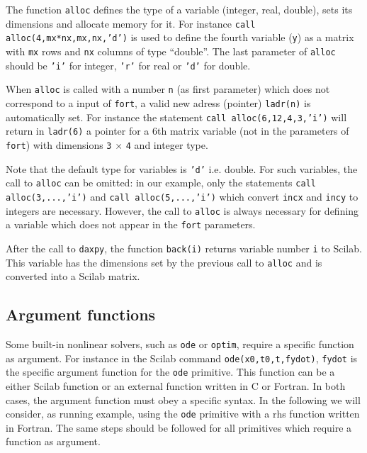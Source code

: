 The function {\tt alloc} defines the type of a variable (integer,
real, double), sets its
dimensions and allocate memory for it. 
For instance {\tt call alloc(4,mx*nx,mx,nx,'d')} is used to define
the fourth variable ({\tt y}) as a matrix with {\tt mx} rows and {\tt nx}
columns of type ``double''.
The last parameter of {\tt alloc} should be {\tt 'i'} for integer, 
{\tt 'r'} for real or {\tt 'd'} for double.


 When {\tt alloc} is called with a number {\tt n} 
(as first parameter) which does not correspond to a input of {\tt fort},
a valid new adress (pointer) {\tt ladr(n)} is automatically set.
For instance the statement {\tt call alloc(6,12,4,3,'i')} will 
return in {\tt ladr(6)}  a pointer for a 6th matrix variable (not in the 
parameters of {\tt fort}) with dimensions
{\tt 3} $\times$ {\tt 4} and integer type.

Note that the default type for variables is {\tt 'd'} i.e. double.
For such variables, the call to {\tt alloc} can be omitted: in our example,
only the statements {\tt call alloc(3,...,'i')} 
and {\tt call alloc(5,...,'i')} which convert {\tt incx} and 
{\tt incy} to integers are necessary. However, the call to 
{\tt alloc} is always necessary for defining a variable which does not 
appear in the {\tt fort} parameters.

After the call to {\tt daxpy}, the function {\tt back(i)} returns 
variable number {\tt i} to Scilab. This variable has the dimensions
set by the previous call to {\tt alloc} and is converted into a Scilab
matrix.

\subsection{Argument functions}
Some built-in nonlinear solvers, such as {\tt ode} or {\tt optim}, require a 
specific function as argument. For instance in the Scilab command
{\tt ode(x0,t0,t,fydot)}, {\tt fydot} is the specific argument function
for the {\tt ode} primitive.
This function can be a either Scilab function or an external
function written in C or Fortran.
In both cases, the argument function must obey a specific
syntax. In the following we will consider, as running example, using 
the {\tt ode} primitive with a rhs function written in Fortran. The
same steps should be followed for all primitives which require
a function as argument.

